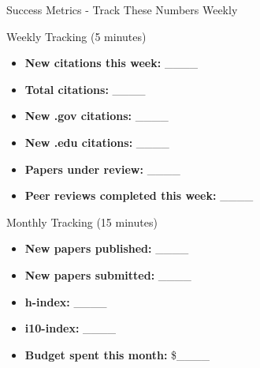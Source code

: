 \documentclass[11pt]{beamer}
\begin{document}
	\begin{frame}{Success Metrics - Track These Numbers Weekly}
		\scriptsize
		\begin{block}{Weekly Tracking (5 minutes)}
			\begin{itemize}
				\item \textbf{New citations this week:} \_\_\_\_
				\item \textbf{Total citations:} \_\_\_\_
				\item \textbf{New .gov citations:} \_\_\_\_
				\item \textbf{New .edu citations:} \_\_\_\_
				\item \textbf{Papers under review:} \_\_\_\_
				\item \textbf{Peer reviews completed this week:} \_\_\_\_
			\end{itemize}
		\end{block}
		\begin{block}{Monthly Tracking (15 minutes)}
			\begin{itemize}
				\item \textbf{New papers published:} \_\_\_\_
				\item \textbf{New papers submitted:} \_\_\_\_
				\item \textbf{h-index:} \_\_\_\_
				\item \textbf{i10-index:} \_\_\_\_
				\item \textbf{Budget spent this month:} \$\_\_\_\_
			\end{itemize}
		\end{block}
	\end{frame}
	
\end{document}
